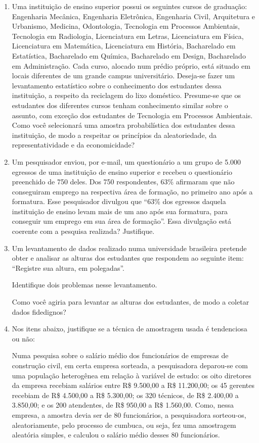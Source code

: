 \begin{enumerate}
	\item Uma instituição de ensino superior possui os seguintes cursos de graduação:
Engenharia Mecânica, Engenharia Eletrônica, Engenharia Civil, Arquitetura e Urbanismo,
Medicina, Odontologia, Tecnologia em Processos Ambientais, Tecnologia em Radiologia,
Licenciatura em Letras, Licenciatura em Física, Licenciatura em Matemática, Licenciatura
em História, Bacharelado em Estatística, Bacharelado em Química, Bacharelado em
Design, Bacharelado em Administração. Cada curso, alocado num prédio próprio, está
situado em locais diferentes de um grande campus universitário. Deseja-se fazer um
levantamento estatístico sobre o conhecimento dos estudantes dessa instituição, a respeito
da reciclagem do lixo doméstico. Presume-se que os estudantes dos diferentes cursos
tenham conhecimento similar sobre o assunto, com exceção dos estudantes de Tecnologia
em Processos Ambientais. Como você selecionará uma amostra probabilística dos
estudantes dessa instituição, de modo a respeitar os princípios da aleatoriedade, da
representatividade e da economicidade?
	
	
	\item Um pesquisador enviou, por e-mail, um questionário a um grupo de 5.000 egressos de
uma instituição de ensino superior e recebeu o questionário preenchido de 750 deles. Dos
750 respondentes, 63\% afirmaram que não conseguiram emprego na respectiva área de
	formação, no primeiro ano após a formatura. Esse pesquisador divulgou que “63\% dos
egressos daquela instituição de ensino levam mais de um ano após sua formatura, para
conseguir um emprego em sua área de formação”. Essa divulgação está coerente com a
pesquisa realizada? Justifique.
	
	
	\item Um levantamento de dados realizado numa universidade brasileira pretende obter e
analisar as alturas dos estudantes que respondem ao seguinte item: “Registre sua altura,
em polegadas”.
	
	\subitem Identifique dois problemas nesse levantamento.
	
	\subitem Como você agiria para levantar as alturas dos estudantes, de modo a coletar dados
fidedignos?
	
	\item Nos itens abaixo, justifique se a técnica de amostragem usada é tendenciosa ou não:
	
	\subitem Numa pesquisa sobre o salário médio dos funcionários de empresas de construção
civil, em certa empresa sorteada, a pesquisadora deparou-se com uma população
heterogênea em relação à variável de estudo: os oito diretores da empresa recebiam
salários entre R\$ 9.500,00 a R\$ 11.200,00; os 45 gerentes recebiam de R\$ 4.500,00
a R\$ 5.300,00; os 320 técnicos, de R\$ 2.400,00 a 3.850,00; e os 200 atendentes, de
R\$ 950,00 a R\$ 1.560,00. Como, nessa empresa, a amostra devia ser de 80
funcionários, a pesquisadora sorteou-os, aleatoriamente, pelo processo de
cumbuca, ou seja, fez uma amostragem aleatória simples, e calculou o salário médio
desses 80 funcionários.
	

\end{enumerate}
